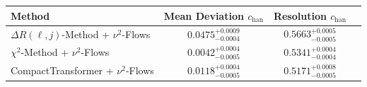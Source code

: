     \begin{tabular}{lccc}
        \toprule
        Method & Mean Deviation $c_{\text{han}}$ & Resolution $c_{\text{han}}$ \\
        \midrule
        $\Delta R(\ell,j)$-Method + $\nu^2$-Flows & $0.0475^{+0.0009}_{-0.0004}$ & $0.5663^{+0.0005}_{-0.0005}$ \\
        $\chi^2$-Method + $\nu^2$-Flows & $0.0042^{+0.0004}_{-0.0005}$ & $0.5341^{+0.0004}_{-0.0004}$ \\
        CompactTransformer + $\nu^2$-Flows & $0.0118^{+0.0004}_{-0.0005}$ & $0.5171^{+0.0008}_{-0.0005}$ \\
        \bottomrule
    \end{tabular}
